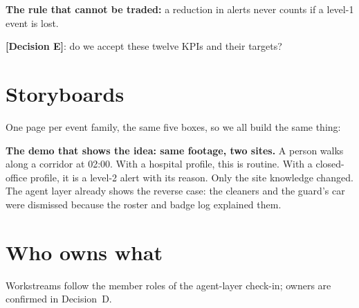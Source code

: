\documentclass[11pt,a4paper]{article}
\newcommand{\decision}[1]{\textbf{\color{accent}[Decision #1]}}
\begin{document}
\begin{rulebox}
\textbf{The rule that cannot be traded:} a reduction in alerts never counts if a level-1 event is lost.
\end{rulebox}
\decision{E}: do we accept these twelve KPIs and their targets?

\section{Storyboards}
One page per event family, the same five boxes, so we all build the same thing:

\begin{center}
\end{center}

\begin{keybox}
\textbf{The demo that shows the idea: same footage, two sites.} A person walks along a corridor at 02:00. With a
hospital profile, this is routine. With a closed-office profile, it is a level-2 alert with its reason. Only the site
knowledge changed. The agent layer already shows the reverse case: the cleaners and the guard's car were dismissed
because the roster and badge log explained them.
\end{keybox}

\section{Who owns what}
Workstreams follow the member roles of the agent-layer check-in; owners are confirmed in Decision~D.
\end{document}

